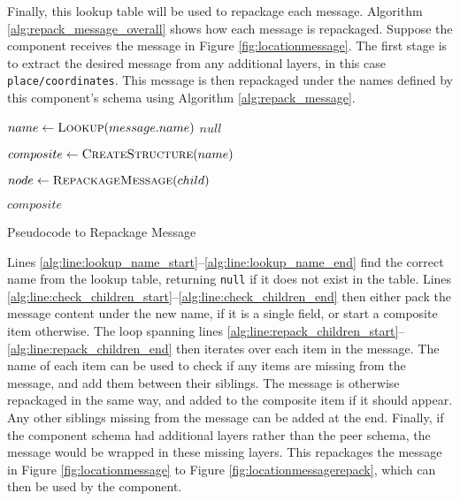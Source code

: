 \documentclass[12pt,twoside,notitlepage]{report}
\begin{document}
Finally, this lookup table will be used to repackage each message. 
Algorithm \ref{alg:repack_message_overall} shows how each message is repackaged. 
Suppose the component receives the message in Figure \ref{fig:locationmessage}. 
The first stage is to extract the desired message from any additional layers, in this case {\tt place/coordinates}. 
This message is then repackaged under the names defined by this component's schema using Algorithm \ref{alg:repack_message}. 
\begin{algorithm}
\begin{algorithmic}[1]
	 \label{alg:line:lookup_name_start}
		\State $name\gets \Call{Lookup}{message.name}$
	\Else
		\State \Return $null$
	\EndIf \label{alg:line:lookup_name_end}
	
	 \label{alg:line:check_children_start}
		\State \Return {}
	\Else
		\State $composite\gets \Call{CreateStructure}{name}$
	\EndIf \label{alg:line:check_children_end}
		
	 \label{alg:line:repack_children_start}
		\State {}
		
		\State $node \gets \Call{RepackageMessage}{child}$
			\State {}
		\EndIf
	\EndFor \label{alg:line:repack_children_end}
	
	\State {}

	\State \Return $composite$
	
\EndFunction
\end{algorithmic}
\caption{Pseudocode to Repackage Message}
\label{alg:repack_message}
\end{algorithm}
Lines \ref{alg:line:lookup_name_start}--\ref{alg:line:lookup_name_end} find the correct name from the lookup table, returning {\tt null} if it does not exist in the table. 
Lines \ref{alg:line:check_children_start}--\ref{alg:line:check_children_end} then either pack the message content under the new name, if it is a single field, or start a composite item otherwise. 
The loop spanning lines \ref{alg:line:repack_children_start}--\ref{alg:line:repack_children_end} then iterates over each item in the message. 
The name of each item can be used to check if any items are missing from the message, and add them between their siblings. 
The message is otherwise repackaged in the same way, and added to the composite item if it should appear. 
Any other siblings missing from the message can be added at the end. 
Finally, if the component schema had additional layers rather than the peer schema, the message would be wrapped in these missing layers. 
This repackages the message in Figure \ref{fig:locationmessage} to Figure \ref{fig:locationmessagerepack}, which can then be used by the component.  
\end{document}
